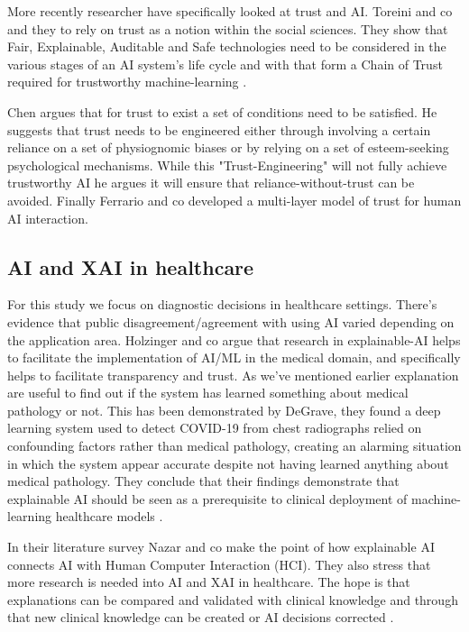 \documentclass[manuscript,screen,review]{acmart}
\begin{document}
More recently researcher have specifically looked at trust and AI.
Toreini and co and they to rely on trust as a notion within the social sciences. They show that Fair, Explainable, Auditable and Safe technologies need to be considered in the various stages of an AI system's life cycle and with that form a Chain of Trust required for trustworthy machine-learning \cite{Toreini2020}.

Chen argues that for trust to exist a set of conditions need to be satisfied.
He suggests that trust needs to be engineered either through involving a certain reliance on a set of physiognomic biases or by relying on a set of esteem-seeking psychological mechanisms. While this "Trust-Engineering" will not fully achieve trustworthy AI he argues it will ensure that reliance-without-trust can be avoided\cite{Chen2021}.
Finally Ferrario and co developed a multi-layer model of trust for human AI interaction\cite{Ferrario2020}.

\subsection{AI and XAI in healthcare}\label{subsec:ai-in-healthcare}

For this study we focus on diagnostic decisions in healthcare settings. There's evidence that public disagreement/agreement with using AI varied depending on the application area\cite{Ikkatai2022}.
Holzinger and co argue that research in explainable-AI helps to facilitate the implementation of AI/ML in the medical domain, and specifically helps to facilitate transparency and trust\cite{Holzinger2017}.
As we've mentioned earlier explanation are useful to find out if the system has learned something about medical pathology or not.
This has been demonstrated by DeGrave, they found a deep learning system used to detect COVID-19 from chest radiographs relied on confounding factors rather than medical pathology, creating an alarming situation in which the system appear accurate despite not having learned anything about medical pathology.
They conclude that their findings demonstrate that explainable AI should be seen as a prerequisite to clinical deployment of machine-learning healthcare models \cite{DeGrave2021}.

In their literature survey Nazar and co make the point of how explainable AI connects AI with Human Computer Interaction (HCI).
They also stress that more research is needed into AI and XAI in healthcare.
The hope is that explanations can be compared and validated with clinical knowledge and through that new clinical knowledge can be created or AI decisions corrected \cite{Nazar2021}.
\end{document}
